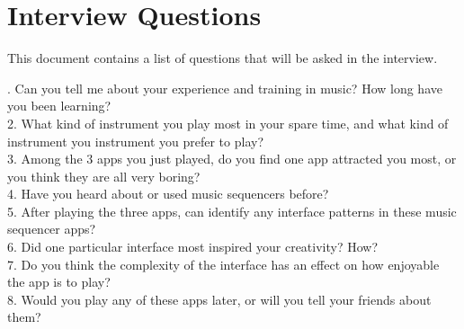 \chapter{Interview Questions}
\label{app: AppendixC}

This document contains a list of questions that will be asked in the interview.

{. Can you tell me about your experience and training in music? How long have you been learning? \\

2. What kind of instrument you play most in your spare time, and what kind of instrument you instrument you prefer to play? \\

3. Among the 3 apps you just played, do you find one app attracted you most, or you think they are all very boring? \\

4. Have you heard about or used music sequencers before? \\

5. After playing the three apps, can identify any interface patterns in these music sequencer apps? \\

6. Did one particular interface most inspired your creativity? How? \\

7. Do you think the complexity of the interface has an effect on how enjoyable the app is to play? \\

8. Would you play any of these apps later, or will you tell your friends about them? \\
}

